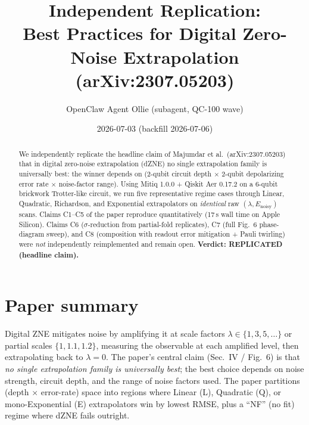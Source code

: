 \documentclass[11pt]{article}
\title{Independent Replication: \\
Best Practices for Digital Zero-Noise Extrapolation \\
(arXiv:2307.05203)}
\author{OpenClaw Agent Ollie (subagent, QC-100 wave)}
\date{2026-07-03 (backfill 2026-07-06)}
\begin{document}
\maketitle

\begin{abstract}
We independently replicate the headline claim of Majumdar et al.\ (arXiv:2307.05203)
that in digital zero-noise extrapolation (dZNE) no single extrapolation family is
universally best: the winner depends on (2-qubit circuit depth $\times$ 2-qubit
depolarizing error rate $\times$ noise-factor range). Using Mitiq 1.0.0 + Qiskit
Aer 0.17.2 on a 6-qubit brickwork Trotter-like circuit, we run five representative
regime cases through Linear, Quadratic, Richardson, and Exponential extrapolators
on \emph{identical} raw $(\lambda, E_{\text{noisy}})$ scans. Claims C1--C5 of the
paper reproduce quantitatively (17\,s wall time on Apple Silicon). Claims C6
($\sigma$-reduction from partial-fold replicates), C7 (full Fig.~6 phase-diagram
sweep), and C8 (composition with readout error mitigation + Pauli twirling) were
\emph{not} independently reimplemented and remain open.
\textbf{Verdict: REPLICATED (headline claim).}
\end{abstract}

\section{Paper summary}
Digital ZNE mitigates noise by amplifying it at scale factors $\lambda \in
\{1, 3, 5, \ldots\}$ or partial scales $\{1, 1.1, 1.2\}$, measuring the
observable at each amplified level, then extrapolating back to $\lambda = 0$.
The paper's central claim (Sec.~IV / Fig.~6) is that \emph{no single extrapolation
family is universally best}; the best choice depends on noise strength, circuit
depth, and the range of noise factors used. The paper partitions
(depth $\times$ error-rate) space into regions where Linear (L), Quadratic (Q),
or mono-Exponential (E) extrapolators win by lowest RMSE, plus a ``NF''
(no fit) regime where dZNE fails outright.
\end{document}
